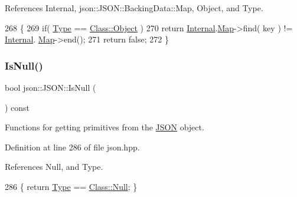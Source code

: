 References Internal, json\+::\+J\+S\+O\+N\+::\+Backing\+Data\+::\+Map, Object, and Type.


\begin{DoxyCode}
268                                                \{
269             \textcolor{keywordflow}{if}( \mbox{\hyperlink{classjson_1_1_j_s_o_n_a3fa6923afa41bdfe38077fbc0079aaf5}{Type}} == \mbox{\hyperlink{classjson_1_1_j_s_o_n_a762f55df6d407c1af61607ed516ffe07a497031794414a552435f90151ac3b54b}{Class::Object}} )
270                 \textcolor{keywordflow}{return} \mbox{\hyperlink{classjson_1_1_j_s_o_n_a1e2a064794c3d55c8bb8887fc5734947}{Internal}}.\mbox{\hyperlink{unionjson_1_1_j_s_o_n_1_1_backing_data_ab2e19b00745b37d2add157ff3a35c431}{Map}}->find( key ) != \mbox{\hyperlink{classjson_1_1_j_s_o_n_a1e2a064794c3d55c8bb8887fc5734947}{Internal}}.
      \mbox{\hyperlink{unionjson_1_1_j_s_o_n_1_1_backing_data_ab2e19b00745b37d2add157ff3a35c431}{Map}}->end();
271             \textcolor{keywordflow}{return} \textcolor{keyword}{false};
272         \}
\end{DoxyCode}
\mbox{\label{classjson_1_1_j_s_o_n_ab047731707304fc5ac9bd9d6851cd2d9}} 
\subsubsection{\texorpdfstring{Is\+Null()}{IsNull()}}
{\footnotesize\ttfamily bool json\+::\+J\+S\+O\+N\+::\+Is\+Null (\begin{DoxyParamCaption}{ }\end{DoxyParamCaption}) const\hspace{0.3cm}{\ttfamily [inline]}}



Functions for getting primitives from the \mbox{\hyperlink{classjson_1_1_j_s_o_n}{J\+S\+ON}} object. 



Definition at line 286 of file json.\+hpp.



References Null, and Type.


\begin{DoxyCode}
286 \{ \textcolor{keywordflow}{return} \mbox{\hyperlink{classjson_1_1_j_s_o_n_a3fa6923afa41bdfe38077fbc0079aaf5}{Type}} == \mbox{\hyperlink{classjson_1_1_j_s_o_n_a762f55df6d407c1af61607ed516ffe07abbb93ef26e3c101ff11cdd21cab08a94}{Class::Null}}; \}
\end{DoxyCode}
\mbox{\label{classjson_1_1_j_s_o_n_a3c91ab49425b2542665a194d6c07ecb6}} 

